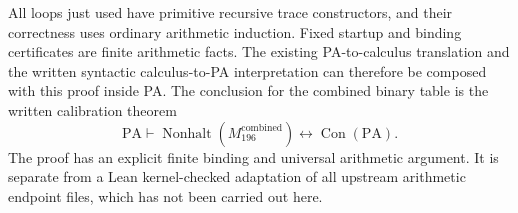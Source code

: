 All loops just used have primitive recursive trace constructors, and their
correctness uses ordinary arithmetic induction.  Fixed startup and binding
certificates are finite arithmetic facts.  The existing PA-to-calculus
translation and the written syntactic calculus-to-PA interpretation can
therefore be composed with this proof inside PA.  The conclusion for the
combined binary table is the written calibration theorem
\[
 \mathrm{PA}\vdash
 \operatorname{Nonhalt}(M_{196}^{\mathrm{combined}})
       \longleftrightarrow\operatorname{Con}(\mathrm{PA}).
\]
The proof has an explicit finite binding and universal arithmetic argument.
It is separate from a Lean kernel-checked adaptation of all upstream
arithmetic endpoint files, which has not been carried out here.
